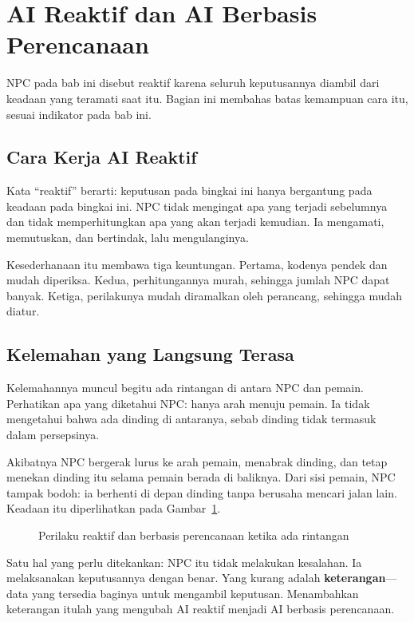 \section{AI Reaktif dan AI Berbasis Perencanaan}
\label{sec:reaktif-perencanaan}

NPC pada bab ini disebut reaktif karena seluruh keputusannya diambil dari
keadaan yang teramati saat itu. Bagian ini membahas batas kemampuan cara itu,
sesuai indikator  pada bab ini.

\subsection{Cara Kerja AI Reaktif}

Kata ``reaktif'' berarti: keputusan pada bingkai ini hanya bergantung pada
keadaan pada bingkai ini. NPC tidak mengingat apa yang terjadi sebelumnya dan
tidak memperhitungkan apa yang akan terjadi kemudian. Ia mengamati, memutuskan,
dan bertindak, lalu mengulanginya.

Kesederhanaan itu membawa tiga keuntungan. Pertama, kodenya pendek dan mudah
diperiksa. Kedua, perhitungannya murah, sehingga jumlah NPC dapat banyak.
Ketiga, perilakunya mudah diramalkan oleh perancang, sehingga mudah diatur.

\subsection{Kelemahan yang Langsung Terasa}

Kelemahannya muncul begitu ada rintangan di antara NPC dan pemain. Perhatikan
apa yang diketahui NPC: hanya arah menuju pemain. Ia tidak mengetahui bahwa
ada dinding di antaranya, sebab dinding tidak termasuk dalam persepsinya.

Akibatnya NPC bergerak lurus ke arah pemain, menabrak dinding, dan tetap
menekan dinding itu selama pemain berada di baliknya. Dari sisi pemain, NPC
tampak bodoh: ia berhenti di depan dinding tanpa berusaha mencari jalan lain.
Keadaan itu diperlihatkan pada Gambar~\ref{fig:reaktif-perencanaan}.

\begin{figure}[htbp]
\centering

\caption{Perilaku reaktif dan berbasis perencanaan ketika ada rintangan}
\label{fig:reaktif-perencanaan}
\end{figure}

Satu hal yang perlu ditekankan: NPC itu tidak melakukan kesalahan. Ia
melaksanakan keputusannya dengan benar. Yang kurang adalah
\textbf{keterangan}---data yang tersedia baginya untuk mengambil keputusan.
Menambahkan keterangan itulah yang mengubah AI reaktif menjadi AI berbasis
perencanaan.

